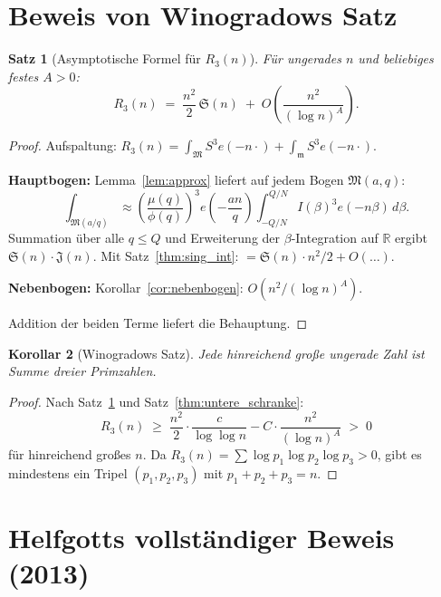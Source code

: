 \documentclass[12pt,a4paper]{amsart}
\newtheorem{theorem}{Satz}[section]
\newtheorem{korollar}[theorem]{Korollar}
\theoremstyle{definition}
\newcommand{\R}{\mathbb{R}}
\newcommand{\eq}[1]{e\!\left(#1\right)}
\begin{document}
\section{Beweis von Winogradows Satz}
\label{sec:beweis}

\begin{theorem}[Asymptotische Formel für $R_3(n)$]\label{thm:asymptotisch}
  Für ungerades $n$ und beliebiges festes $A > 0$:
  \[
    R_3(n)
    \;=\; \frac{n^2}{2}\, \mathfrak{S}(n)
          \;+\; O\!\left(\frac{n^2}{(\log n)^A}\right).
  \]
\end{theorem}

\begin{proof}
  Aufspaltung:
  $R_3(n) = \int_{\mathfrak{M}} S^3 \eq{-n\cdot} + \int_{\mathfrak{m}} S^3 \eq{-n\cdot}$.

  \textbf{Hauptbogen:}  Lemma~\ref{lem:approx} liefert auf jedem
  Bogen $\mathfrak{M}(a,q)$:
  \[
    \int_{\mathfrak{M}(a/q)} \approx
    \left(\frac{\mu(q)}{\phi(q)}\right)^3 \eq{-\frac{an}{q}}
    \int_{-Q/N}^{Q/N} I(\beta)^3 \eq{-n\beta}\, d\beta.
  \]
  Summation über alle $q \leq Q$ und Erweiterung der $\beta$-Integration
  auf $\R$ ergibt $\mathfrak{S}(n) \cdot \mathfrak{J}(n)$.
  Mit Satz~\ref{thm:sing_int}: $= \mathfrak{S}(n) \cdot n^2/2 + O(\ldots)$.

  \textbf{Nebenbogen:}  Korollar~\ref{cor:nebenbogen}: $O(n^2/(\log n)^A)$.

  Addition der beiden Terme liefert die Behauptung.
\end{proof}

\begin{korollar}[Winogradows Satz]\label{cor:winogradow}
  Jede hinreichend große ungerade Zahl ist Summe dreier Primzahlen.
\end{korollar}

\begin{proof}
  Nach Satz~\ref{thm:asymptotisch} und Satz~\ref{thm:untere_schranke}:
  \[
    R_3(n) \;\geq\; \frac{n^2}{2} \cdot \frac{c}{\log\log n}
                    - C \cdot \frac{n^2}{(\log n)^A} \;>\; 0
  \]
  für hinreichend großes $n$.  Da $R_3(n) = \sum \log p_1 \log p_2 \log p_3 > 0$,
  gibt es mindestens ein Tripel $(p_1, p_2, p_3)$ mit $p_1 + p_2 + p_3 = n$.
\end{proof}

\section{Helfgotts vollständiger Beweis (2013)}
\label{sec:helfgott}
\end{document}
